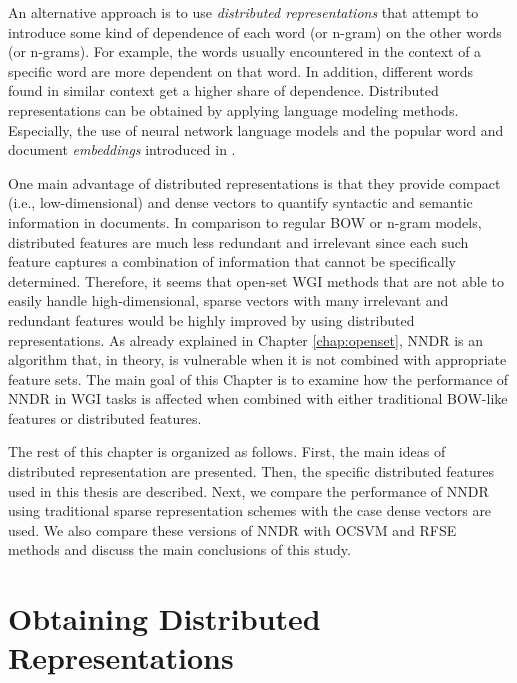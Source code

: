 An alternative approach is to use \textit{distributed representations} that attempt to introduce some kind of dependence of each word (or n-gram) on the other words (or n-grams). For example, the words usually encountered in the context of a specific word are more dependent on that word. In addition, different words found in similar context get a higher share of dependence. Distributed representations can be obtained by applying language modeling methods. Especially, the use of neural network language models and the popular word and document \textit{embeddings} introduced in . 

One main advantage of distributed representations is that they provide compact (i.e., low-dimensional) and dense vectors to quantify syntactic and semantic information in documents. In comparison to regular BOW or n-gram models, distributed features are much less redundant and irrelevant since each such feature captures a combination of information that cannot be specifically determined. Therefore, it seems that open-set WGI methods that are not able to easily handle high-dimensional, sparse vectors with many irrelevant and redundant features would be highly improved by using distributed representations. As already explained in Chapter \ref{chap:openset}, NNDR is an algorithm that, in theory, is vulnerable when it is not combined with appropriate feature sets. The main goal of this Chapter is to examine how the performance of NNDR in WGI tasks is affected when combined with either traditional BOW-like features or distributed features. 

The rest of this chapter is organized as follows. First, the main ideas of distributed representation are presented. Then, the specific distributed features used in this thesis are described. Next, we compare the performance of NNDR using traditional sparse representation schemes with the case dense vectors are used. We also compare these versions of NNDR with OCSVM and RFSE methods and discuss the main conclusions of this study.

\section{Obtaining Distributed Representations}


